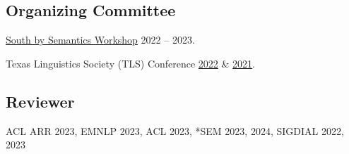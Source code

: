 \subsection{Organizing Committee}

\quad \href{https://sites.utexas.edu/sxsemantics}{South by Semantics Workshop} 2022 -- 2023.

\quad Texas Linguistics Society (TLS) Conference \href{http://tls.ling.utexas.edu/2022/}{2022} \& \href{http://tls.ling.utexas.edu/2021/}{2021}.

\subsection{Reviewer}

\quad ACL ARR 2023, EMNLP 2023, ACL 2023, *SEM 2023, 2024, SIGDIAL 2022, 2023
